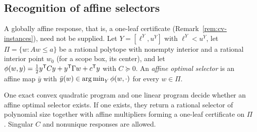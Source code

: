 \subsection{Recognition of affine selectors}

A globally affine response, that is, a one-leaf certificate
(Remark~\ref{rem:cv-instances}), need not be supplied. Let $Y=[\ell^Y,u^Y]$ with
$\ell^Y<u^Y$, let $\Pi=\{w:Aw\le a\}$ be a rational polytope with nonempty
interior and a rational interior point $w_0$ (for a scope box, its center),
and let $\phi(w,y)=\frac12y^{\mathsf T}Cy+y^{\mathsf T}\Gamma w+c^{\mathsf T}y$ with $C\succeq0$.
An \emph{affine optimal selector} is an affine map $\bar y$ with
$\bar y(w)\in\operatorname*{arg\,min}_{Y}\phi(w,\cdot)$ for every $w\in\Pi$.

\begin{theorem}\label{thm:cv-recog}
One exact convex quadratic program and one linear program decide whether an
affine optimal selector exists. If one exists, they return a rational
selector of polynomial size together with affine multipliers forming a
one-leaf certificate on $\Pi$. Singular $C$ and nonunique responses are
allowed.
\end{theorem}

